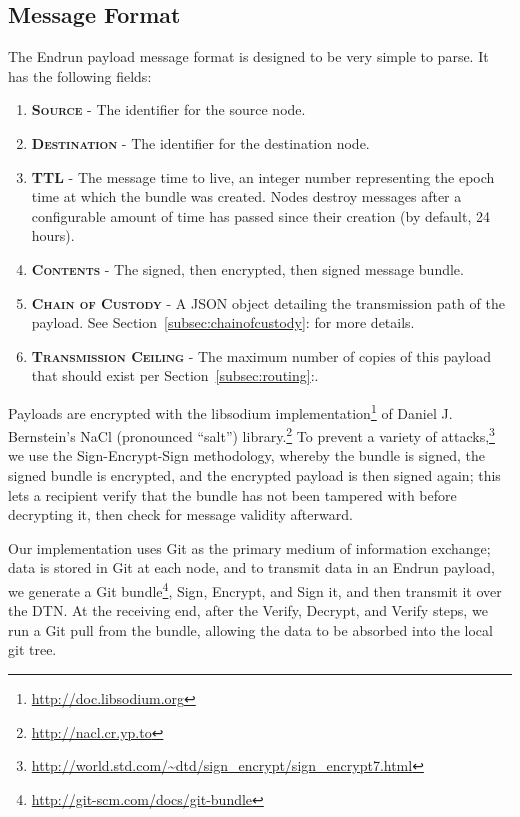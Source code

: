 \documentclass[12pt]{article}
\begin{document}
  \subsection{Message Format}
  
  The Endrun payload message format is designed to be very simple to parse. It has the following fields:
  
  \begin{enumerate}
    \item \textbf{\textsc{Source}} - The identifier for the source node.
    \item \textbf{\textsc{Destination}} - The identifier for the destination node.
    \item \textbf{\textsc{TTL}} - The message time to live, an integer number representing the epoch time at which the bundle was created. Nodes destroy messages after a configurable amount of time has passed since their creation (by default, 24 hours).
    \item \textbf{\textsc{Contents}} - The signed, then encrypted, then signed message bundle.
    \item \textbf{\textsc{Chain of Custody}} - A JSON object detailing the transmission path of the payload. See Section~\ref{subsec:chainofcustody}: for more details.
    \item \textbf{\textsc{Transmission Ceiling}} - The maximum number of copies of this payload that should exist per Section~\ref{subsec:routing}:.

    \end{enumerate}
    
    Payloads are encrypted with the libsodium implementation\footnote{\url{http://doc.libsodium.org}} of Daniel J. Bernstein's NaCl (pronounced ``salt'') library.\footnote{\url{http://nacl.cr.yp.to}} To prevent a variety of attacks,\footnote{\url{http://world.std.com/~dtd/sign_encrypt/sign_encrypt7.html}} we use the Sign-Encrypt-Sign methodology, whereby the bundle is signed, the signed bundle is encrypted, and the encrypted payload is then signed again; this lets a recipient verify that the bundle has not been tampered with before decrypting it, then check for message validity afterward.
    
    Our implementation uses Git as the primary medium of information exchange; data is stored in Git at each node, and to transmit data in an Endrun payload, we generate a Git bundle\footnote{\url{http://git-scm.com/docs/git-bundle}}, Sign, Encrypt, and Sign it, and then transmit it over the DTN. At the receiving end, after the Verify, Decrypt, and Verify steps, we run a Git pull from the bundle, allowing the data to be absorbed into the local git tree.
    
\end{document}
